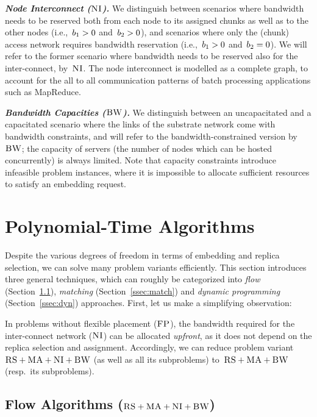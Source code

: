 \textbf{\emph{Node Interconnect ($\textsc{NI}$).}} We distinguish between scenarios
where bandwidth needs to be reserved
both from each node to its assigned chunks as well as to the other nodes
(i.e.,~$b_1>0$ and~$b_2>0$), and
 scenarios where only the (chunk) access network requires bandwidth reservation (i.e.,~$b_1>0$ and~$b_2=0$).
 We will refer to the former scenario
where bandwidth needs to be reserved also for the inter-connect, by~$\textsc{NI}$. 
The node interconnect is modelled as a complete graph, to account for the all to all communication patterns of batch processing applications such as MapReduce.


\textbf{\emph{Bandwidth Capacities ($\textsc{BW}$).}}
We distinguish between an uncapacitated and a capacitated scenario where the links
of the substrate network come with bandwidth
constraints, and will refer to the bandwidth-constrained version by~$\textsc{BW}$; the capacity of servers
(the number of nodes which can be hosted concurrently) is always limited.
Note that capacity constraints introduce infeasible problem instances, where it is impossible to
allocate sufficient resources to satisfy an embedding request.

\section{Polynomial-Time Algorithms}\label{sec:poly}


Despite the various degrees of freedom in terms of embedding and replica selection,
we can solve many problem variants efficiently.
 This section introduces three general techniques,
 which can roughly be categorized into
 \emph{flow} (Section~\ref{ssec:flow}), \emph{matching} (Section~\ref{ssec:match}) and \emph{dynamic programming}
 (Section~\ref{ssec:dyn}) approaches.
First, let us make a simplifying observation:
\begin{obs}\label{obs:nofp}
In problems without flexible placement ($\textsc{FP}$),
the bandwidth required
for the inter-connect network ($\textsc{NI}$) can be allocated \emph{upfront}, 
as it
does not depend on the replica
selection and assignment.
Accordingly, we can reduce problem variant~$\textsc{RS}+\textsc{MA}+\textsc{NI} +\textsc{BW}$ (as well as all its subproblems)
to~$\textsc{RS}+\textsc{MA}+\textsc{BW}$ (resp.~its subproblems).
\end{obs}

\subsection{Flow Algorithms ($\textsc{RS}+\textsc{MA}+\textsc{NI}+\textsc{BW}$)}\label{ssec:flow}



